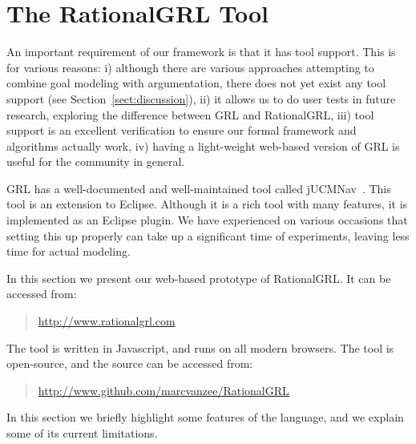\section{The RationalGRL Tool}
\label{sect:tool}

An important requirement of our framework is that it has tool support. This is for various reasons: i) although there are various approaches attempting to combine goal modeling with argumentation, there does not yet exist any tool support (see Section~\ref{sect:discussion}), ii) it allows us to do user tests in future research, exploring the difference between GRL and RationalGRL, iii) tool support is an excellent verification to ensure our formal framework and algorithms actually work, iv) having a light-weight web-based version of GRL is useful for the community in general.

GRL has a well-documented and well-maintained tool called jUCMNav~\cite{jUCMNav}. This tool is an extension to Eclipse. Although it is a rich tool with many features, it is implemented as an Eclipse plugin. We have experienced on various occasions that setting this up properly can take up a significant time of experiments, leaving less time for actual modeling.

In this section we present our web-based prototype of RationalGRL. It can be accessed from:
\begin{quote}
\url{http://www.rationalgrl.com}
\end{quote}

The tool is written in Javascript, and runs on all modern browsers. The tool is open-source, and the source can be accessed from:
\begin{quote}
\url{http://www.github.com/marcvanzee/RationalGRL}
\end{quote}

In this section we briefly highlight some features of the language, and we explain some of its current limitations.

